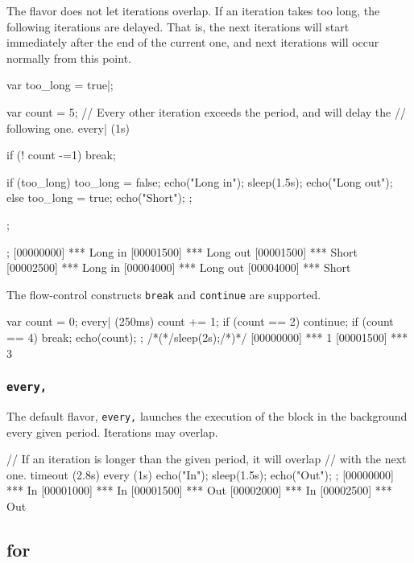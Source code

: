 The  flavor does not let iterations overlap. If an
iteration takes too long, the following iterations are delayed. That
is, the next iterations will start immediately after the end of the
current one, and next iterations will occur normally from this point.

\begin{urbiscript}[firstnumber=last]
{
  var too_long = true|;

  var count = 5;
  // Every other iteration exceeds the period, and will delay the
  // following one.
  every| (1s)
  {
    if (! count -=1)
      break;

    if (too_long)
    {
      too_long = false;
      echo("Long in");
      sleep(1.5s);
      echo("Long out");
    }
    else
    {
      too_long = true;
      echo("Short");
    };
  };
};
[00000000] *** Long in
[00001500] *** Long out
[00001500] *** Short
[00002500] *** Long in
[00004000] *** Long out
[00004000] *** Short
\end{urbiscript}

The flow-control constructs \lstinline|break| and \lstinline|continue|
are supported.

\begin{urbiscript}[firstnumber=last]
{
  var count = 0;
  every| (250ms)
  {
    count += 1;
    if (count == 2)
      continue;
    if (count == 4)
      break;
    echo(count);
  }
};
/*(*/sleep(2s);/*)*/
[00000000] *** 1
[00001500] *** 3
\end{urbiscript}


\subsubsection{\lstinline'every,'}
The default flavor, \lstinline|every,| launches the execution of the
block in the background every given period. Iterations may overlap.

\begin{urbiscript}
// If an iteration is longer than the given period, it will overlap
// with the next one.
timeout (2.8s)
  every (1s)
  {
    echo("In");
    sleep(1.5s);
    echo("Out");
  };
[00000000] *** In
[00001000] *** In
[00001500] *** Out
[00002000] *** In
[00002500] *** Out
\end{urbiscript}

\subsection{for}

